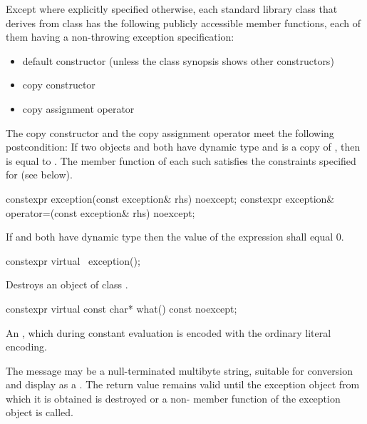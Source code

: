 \pnum
Except where explicitly specified otherwise,
each standard library class  that derives from class 
has the following publicly accessible member functions, each of them having
a non-throwing exception specification:
\begin{itemize}
\item default constructor (unless the class synopsis shows other constructors)
\item copy constructor
\item copy assignment operator
\end{itemize}
The copy constructor and the copy assignment operator meet
the following postcondition: If two objects  and  both have
dynamic type  and  is a copy of , then
 is equal to .
The  member function of each such  satisfies the
constraints specified for  (see below).

%
%
\begin{itemdecl}
constexpr exception(const exception& rhs) noexcept;
constexpr exception& operator=(const exception& rhs) noexcept;
\end{itemdecl}

\begin{itemdescr}
\pnum
\ensures
If  and  both have dynamic type 
then the value of the expression  shall equal 0.
\end{itemdescr}

%
\begin{itemdecl}
constexpr virtual ~exception();
\end{itemdecl}

\begin{itemdescr}
\pnum
\effects
Destroys an object of class
.
\end{itemdescr}

%
\begin{itemdecl}
constexpr virtual const char* what() const noexcept;
\end{itemdecl}

\begin{itemdescr}
\pnum
\returns
An  \ntbs{},
which during constant evaluation is encoded with
the ordinary literal encoding.

\pnum
\remarks
The message may be a null-terminated multibyte string,
suitable for conversion and display as a
.
The return value remains valid until the exception object from which
it is obtained is destroyed or a non-
member function of the exception object is called.
\end{itemdescr}

